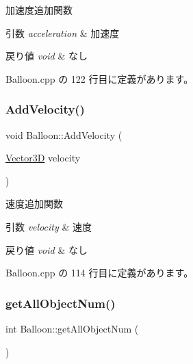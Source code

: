 加速度追加関数 


\begin{DoxyParams}{引数}
{\em acceleration} & 加速度 \\
\hline
\end{DoxyParams}

\begin{DoxyRetVals}{戻り値}
{\em void} & なし \\
\hline
\end{DoxyRetVals}


 Balloon.\+cpp の 122 行目に定義があります。

\mbox{\label{class_balloon_a503ae04cd30e57b0073c829d68f844dd}} 
\subsubsection{\texorpdfstring{Add\+Velocity()}{AddVelocity()}}
{\footnotesize\ttfamily void Balloon\+::\+Add\+Velocity (\begin{DoxyParamCaption}\item[{\mbox{\hyperlink{class_vector3_d}{Vector3D}}}]{velocity }\end{DoxyParamCaption})}



速度追加関数 


\begin{DoxyParams}{引数}
{\em velocity} & 速度 \\
\hline
\end{DoxyParams}

\begin{DoxyRetVals}{戻り値}
{\em void} & なし \\
\hline
\end{DoxyRetVals}


 Balloon.\+cpp の 114 行目に定義があります。

\mbox{\label{class_balloon_afff1be260962ed6e938601a7c08a17eb}} 
\subsubsection{\texorpdfstring{get\+All\+Object\+Num()}{getAllObjectNum()}}
{\footnotesize\ttfamily int Balloon\+::get\+All\+Object\+Num (\begin{DoxyParamCaption}{ }\end{DoxyParamCaption})}



